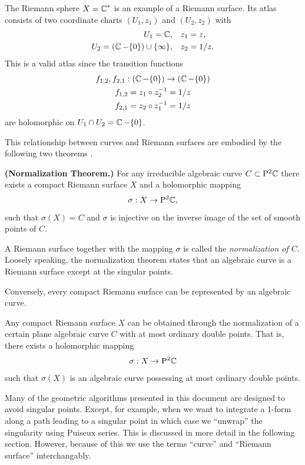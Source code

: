 The Riemann sphere $X = \operatorname{\mathbb{C}}^*$ is an example of a Riemann
surface. Its atlas consists of two coordinate charts $(U_1, z_1)$ and
$(U_2, z_2)$ with
\begin{align*}
    U_1 = \operatorname{\mathbb{C}}, & \quad z_1 = z, \\
    U_2 = \left( \operatorname{\mathbb{C}} - \{0\} \right) \cup \{ \infty \}, & \quad z_2 = 1/z.
\end{align*}
This is a valid atlas since the transition functions
\begin{gather*}
    f_{1,2}, f_{2,1} : \left(\operatorname{\mathbb{C}} - \{0\}\right)
    \to \left(\operatorname{\mathbb{C}} - \{0\}\right) \\
    f_{1,2} = z_1 \circ z_2^{-1} = 1/z \\
    f_{2,1} = z_2 \circ z_1^{-1} = 1/z
\end{gather*}
are holomorphic on $U_1 \cap U_2 = \operatorname{\mathbb{C}} - \{0\}$.

This relationship between curves and Riemann surfaces are embodied by
the following two theorems \cite{Griffiths89}.

\begin{theorem} \label{thm: normalization}
  {\bf (Normalization Theorem.)} For any irreducible algebraic curve $C
  \subset \mathrm{P}^2 \!\operatorname{\mathbb{C}}$ there exists a compact Riemann surface $X$ and
  a holomorphic mapping
  \[
      \sigma : X \to \mathrm{P}^2 \!\operatorname{\mathbb{C}},
  \]
  such that $\sigma( X ) = C$ and $\sigma$ is injective on the
  inverse image of the set of smooth points of $C$.
\end{theorem}

A Riemann surface together with the mapping $\sigma$ is called the {\it
  normalization of $C$}. Loosely speaking, the normalization theorem
states that an algebraic curve is a Riemann surface except at the
singular points.

Conversely, every compact Riemann surface can be represented by an
algebraic curve.
\begin{theorem} \label{thm: repr-theorem}
  Any compact Riemann surface $X$ can be obtained through the
  normalization of a certain plane algebraic curve $C$ with at most
  ordinary double points. That is, there exists a holomorphic mapping
  \[
      \sigma : X \to \mathrm{P}^2 \!\operatorname{\mathbb{C}}
  \]
  such that $\sigma(X)$ is an algebraic curve possessing at most
  ordinary double points.
\end{theorem}
Many of the geometric algorithms presented in this document are designed
to avoid singular points. Except, for example, when we want to integrate
a 1-form along a path leading to a singular point in which case we
``unwrap'' the singularity using Puiseux series. This is discussed in
more detail in the following section. However, because of this we use
the terms ``curve'' and ``Riemann surface'' interchangably.

